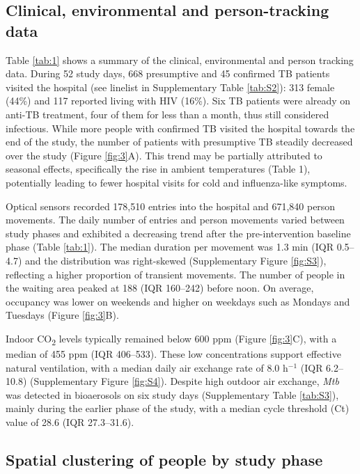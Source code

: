 \documentclass[11pt]{article}
\begin{document}
\subsection{Clinical, environmental and person-tracking data}\label{clinical-environmental-and-person-tracking-data}

Table \ref{tab:1} shows a summary of the clinical, environmental and person tracking data. During 52 study days, 668 presumptive and 45 confirmed TB patients visited the hospital (see linelist in Supplementary Table \ref{tab:S2}): 313 female (44\%) and 117 reported living with HIV (16\%). Six TB patients were already on anti-TB treatment, four of them for less than a month, thus still considered infectious. While more people with confirmed TB visited the hospital towards the end of the study, the number of patients with presumptive TB steadily decreased over the study (Figure \ref{fig:3}A). This trend may be partially attributed to seasonal effects, specifically the rise in ambient temperatures (Table 1), potentially leading to fewer hospital visits for cold and influenza-like symptoms.

Optical sensors recorded 178,510 entries into the hospital and 671,840 person movements. The daily number of entries and person movements varied between study phases and exhibited a decreasing trend after the pre-intervention baseline phase (Table \ref{tab:1}). The median duration per movement was 1.3 min (IQR 0.5--4.7) and the distribution was right-skewed (Supplementary Figure \ref{fig:S3}), reflecting a higher proportion of transient movements. The number of people in the waiting area peaked at 188 (IQR 160--242) before noon. On average, occupancy was lower on weekends and higher on weekdays such as Mondays and Tuesdays (Figure \ref{fig:3}B).

Indoor CO\textsubscript{2}\hspace{0pt} levels typically remained below 600 ppm (Figure \ref{fig:3}C), with a median of 455 ppm (IQR 406--533). These low concentrations support effective natural ventilation, with a median daily air exchange rate of 8.0 h$^{-1}$ (IQR 6.2--10.8)\label{chg:R2.14} (Supplementary Figure \ref{fig:S4}). Despite high outdoor air exchange, \emph{Mtb} was detected in bioaerosols on six study days (Supplementary Table \ref{tab:S3}), mainly during the earlier phase of the study, with a median cycle threshold (Ct) value of 28.6 (IQR 27.3--31.6).

\subsection{Spatial clustering of people by study phase}\label{spatial-clustering-of-people-by-study-phase}
\end{document}
